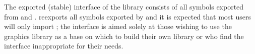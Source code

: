 The exported (stable) interface of the library consists of all symbols
exported from  and .
 reexports all symbols exported by
 and it is expected that most users will only
import ; the  interface is
aimed solely at those wishing to use the graphics library as a base on
which to build their own library or who find the
 interface inappropriate for their needs.


\iffalse
%

\else

\fi




